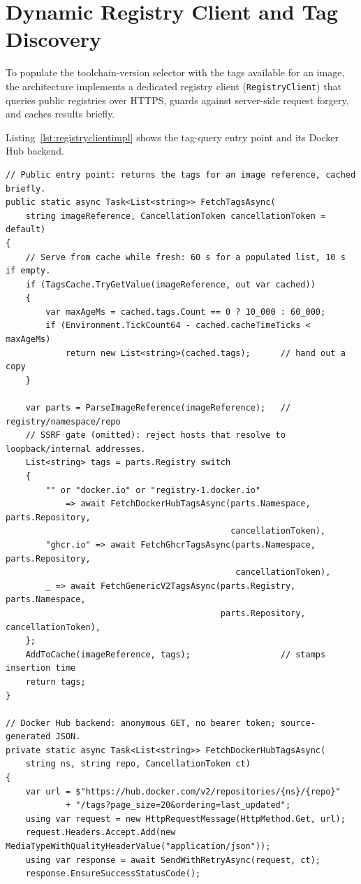 \section{Dynamic Registry Client and Tag Discovery}
To populate the toolchain-version selector with the tags available for an image, the architecture implements a dedicated registry client (\texttt{RegistryClient}) that queries public registries over HTTPS, guards against server-side request forgery, and caches results briefly.

Listing~\ref{lst:registryclientimpl} shows the tag-query entry point and its Docker Hub backend.

\begin{lstlisting}[language=CSharp, basicstyle=\ttfamily\scriptsize, caption={Registry tag query and caching (simplified)}, label={lst:registryclientimpl}]
// Public entry point: returns the tags for an image reference, cached briefly.
public static async Task<List<string>> FetchTagsAsync(
    string imageReference, CancellationToken cancellationToken = default)
{
    // Serve from cache while fresh: 60 s for a populated list, 10 s if empty.
    if (TagsCache.TryGetValue(imageReference, out var cached))
    {
        var maxAgeMs = cached.tags.Count == 0 ? 10_000 : 60_000;
        if (Environment.TickCount64 - cached.cacheTimeTicks < maxAgeMs)
            return new List<string>(cached.tags);      // hand out a copy
    }

    var parts = ParseImageReference(imageReference);   // registry/namespace/repo
    // SSRF gate (omitted): reject hosts that resolve to loopback/internal addresses.
    List<string> tags = parts.Registry switch
    {
        "" or "docker.io" or "registry-1.docker.io"
            => await FetchDockerHubTagsAsync(parts.Namespace, parts.Repository,
                                             cancellationToken),
        "ghcr.io" => await FetchGhcrTagsAsync(parts.Namespace, parts.Repository,
                                              cancellationToken),
        _ => await FetchGenericV2TagsAsync(parts.Registry, parts.Namespace,
                                           parts.Repository, cancellationToken),
    };
    AddToCache(imageReference, tags);                  // stamps insertion time
    return tags;
}

// Docker Hub backend: anonymous GET, no bearer token; source-generated JSON.
private static async Task<List<string>> FetchDockerHubTagsAsync(
    string ns, string repo, CancellationToken ct)
{
    var url = $"https://hub.docker.com/v2/repositories/{ns}/{repo}"
            + "/tags?page_size=20&ordering=last_updated";
    using var request = new HttpRequestMessage(HttpMethod.Get, url);
    request.Headers.Accept.Add(new MediaTypeWithQualityHeaderValue("application/json"));
    using var response = await SendWithRetryAsync(request, ct);
    response.EnsureSuccessStatusCode();


\end{lstlisting}

